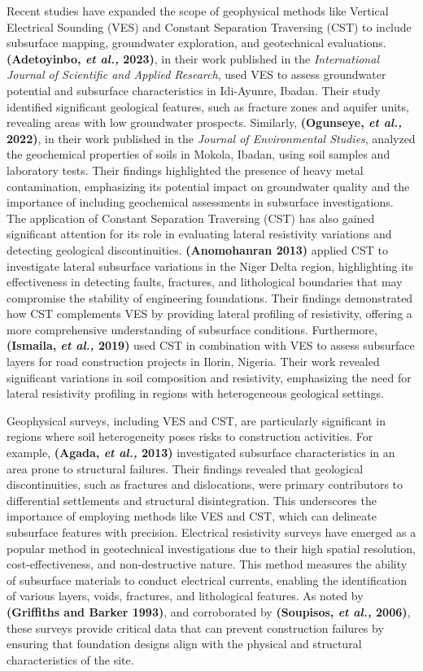 \documentclass[12pt,a4paper]{report}
\begin{document}
Recent studies have expanded the scope of geophysical methods like Vertical Electrical Sounding (VES) and Constant Separation Traversing (CST) to include subsurface mapping, groundwater exploration, and geotechnical evaluations. \textbf{(Adetoyinbo, \textit{et al.,} 2023)}, in their work published in the \textit{International Journal of Scientific and Applied Research}, used VES to assess groundwater potential and subsurface characteristics in Idi-Ayunre, Ibadan. Their study identified significant geological features, such as fracture zones and aquifer units, revealing areas with low groundwater prospects. Similarly, \textbf{(Ogunseye, \textit{et al.,} 2022)}, in their work published in the \textit{Journal of Environmental Studies}, analyzed the geochemical properties of soils in Mokola, Ibadan, using soil samples and laboratory tests. Their findings highlighted the presence of heavy metal contamination, emphasizing its potential impact on groundwater quality and the importance of including geochemical assessments in subsurface investigations. The application of Constant Separation Traversing (CST) has also gained significant attention for its role in evaluating lateral resistivity variations and detecting geological discontinuities. \textbf{(Anomohanran 2013)} applied CST to investigate lateral subsurface variations in the Niger Delta region, highlighting its effectiveness in detecting faults, fractures, and lithological boundaries that may compromise the stability of engineering foundations. Their findings demonstrated how CST complements VES by providing lateral profiling of resistivity, offering a more comprehensive understanding of subsurface conditions. Furthermore, \textbf{(Ismaila, \textit{et al.,} 2019)} used CST in combination with VES to assess subsurface layers for road construction projects in Ilorin, Nigeria. Their work revealed significant variations in soil composition and resistivity, emphasizing the need for lateral resistivity profiling in regions with heterogeneous geological settings.

Geophysical surveys, including VES and CST, are particularly significant in regions where soil heterogeneity poses risks to construction activities. For example, \textbf{(Agada, \textit{et al.,} 2013)} investigated subsurface characteristics in an area prone to structural failures. Their findings revealed that geological discontinuities, such as fractures and dislocations, were primary contributors to differential settlements and structural disintegration. This underscores the importance of employing methods like VES and CST, which can delineate subsurface features with precision. Electrical resistivity surveys have emerged as a popular method in geotechnical investigations due to their high spatial resolution, cost-effectiveness, and non-destructive nature. This method measures the ability of subsurface materials to conduct electrical currents, enabling the identification of various layers, voids, fractures, and lithological features. As noted by \textbf{(Griffiths and Barker 1993)}, and corroborated by \textbf{(Soupisos, \textit{et al.,} 2006)}, these surveys provide critical data that can prevent construction failures by ensuring that foundation designs align with the physical and structural characteristics of the site.
\end{document}
